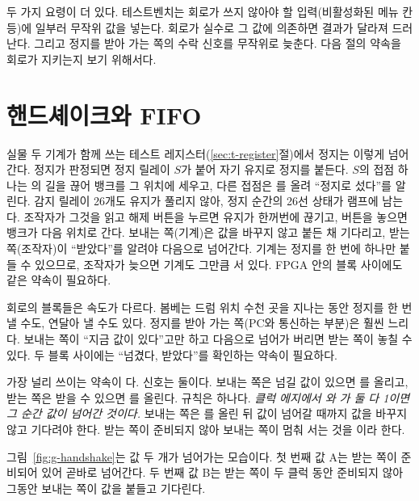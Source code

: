 두 가지 요령이 더 있다. 테스트벤치는 회로가 쓰지 않아야 할 입력(비활성화된 메뉴 칸 등)에 일부러 무작위 값을
넣는다. 회로가 실수로 그 값에 의존하면 결과가 달라져 드러난다. 그리고 정지를 받아 가는 쪽의 수락 신호를
무작위로 늦춘다. 다음 절의 약속을 회로가 지키는지 보기 위해서다.

\section{핸드셰이크와 FIFO}\label{sec:handshake}

\Relay 실물 두 기계가 함께 쓰는 테스트 레지스터(\ref{sec:t-register}절)에서 정지는 이렇게 넘어간다. 정지가
판정되면 정지 릴레이 $S$가 붙어 자기 유지로 정지를 붙든다. $S$의 접점 하나는 의 길을 끊어 뱅크를
그 위치에 세우고, 다른 접점은 를 올려 ``정지로 섰다''를 알린다. 감지 릴레이 26개도 유지가
풀리지 않아, 정지 순간의 26선 상태가 램프에 남는다. 조작자가 그것을 읽고 해제 버튼을 누르면 유지가 한꺼번에
끊기고, 버튼을 놓으면 뱅크가 다음 위치로 간다. 보내는 쪽(기계)은 값을 바꾸지 않고 붙든 채 기다리고, 받는
쪽(조작자)이 ``받았다''를 알려야 다음으로 넘어간다. 기계는 정지를 한 번에 하나만 붙들 수 있으므로, 조작자가
늦으면 기계도 그만큼 서 있다. FPGA 안의 블록 사이에도 같은 약속이 필요하다.

\Why 회로의 블록들은 속도가 다르다. 봄베는 드럼 위치 수천 곳을 지나는 동안 정지를 한 번 낼 수도, 연달아
낼 수도 있다. 정지를 받아 가는 쪽(PC와 통신하는 부분)은 훨씬 느리다. 보내는 쪽이 ``지금 값이 있다''고만
하고 다음으로 넘어가 버리면 받는 쪽이 놓칠 수 있다. 두 블록 사이에는 ``넘겼다, 받았다''를 확인하는 약속이
필요하다.

가장 널리 쓰이는 약속이 다. 신호는 둘이다. 보내는 쪽은 넘길 값이
있으면 를 올리고, 받는 쪽은 받을 수 있으면 를 올린다. 규칙은 하나다.
\emph{클럭 에지에서 와 가 둘 다 1이면 그 순간 값이 넘어간 것이다.} 보내는 쪽은
를 올린 뒤 값이 넘어갈 때까지 값을 바꾸지 않고 기다려야 한다. 받는 쪽이 준비되지 않아 보내는
쪽이 멈춰 서는 것을 이라 한다.

\General 그림~\ref{fig:g-handshake}는 값 두 개가 넘어가는 모습이다. 첫 번째 값 A는 받는 쪽이 준비되어 있어
곧바로 넘어간다. 두 번째 값 B는 받는 쪽이 두 클럭 동안 준비되지 않아 그동안 보내는 쪽이 값을 붙들고
기다린다.

